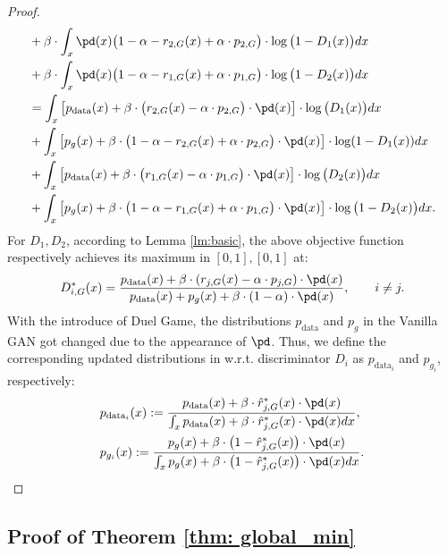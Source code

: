 \begin{proof}
{\begin{align}
\begin{split}
    &+\beta\cdot \int_{x} \pd(x)\big(1-\alpha-r_{2,G}(x)+\alpha \cdot p_{2,G}\big)\cdot \log\big(1-D_1(x)\big)dx\\
    &+\beta \cdot \int_{x} \pd(x)\big(1-\alpha-r_{1,G}(x)+\alpha \cdot p_{1,G}\big)\cdot \log\big(1-D_2(x)\big)dx\\
    &= \int_{x} \big[p_{\text{data}}(x)+\beta \cdot \big(r_{2,G}(x)-\alpha \cdot p_{2,G}\big)\cdot \pd(x)\big] \cdot\log\big(D_1(x)\big) dx\\
    &+ \int_{x} \big[p_{g}(x)+\beta \cdot \big(1-\alpha-r_{2,G}(x)+\alpha \cdot p_{2,G}\big)\cdot \pd(x)\big] \cdot\log(1-D_1(x)) dx\\
    &+ \int_{x} \big[p_{\text{data}}(x)+\beta \cdot \big(r_{1,G}(x)-\alpha \cdot p_{1,G}\big)\cdot \pd(x)\big] \cdot\log\big(D_2(x)\big) dx\\
    &+ \int_{x} \big[p_{g}(x)+\beta \cdot \big(1-\alpha-r_{1,G}(x)+\alpha \cdot p_{1,G}\big)\cdot \pd(x)\big] \cdot\log\big(1-D_2(x)\big) dx.\\
    \end{split}
\end{align}}
For $D_1, D_2$, according to Lemma \ref{lm:basic}, the above objective function respectively achieves its maximum in $[0, 1], [0, 1]$ at: 
\begin{align}
D_{i,G}^*(x)=\dfrac{p_{\text{data}}(x)+\beta \cdot (r_{j,G}(x)-\alpha \cdot p_{j, G})\cdot \pd(x)}{p_{\text{data}}(x)+p_{g}(x)+\beta \cdot (1-\alpha)\cdot \pd(x)}, \qquad i\neq j.
\end{align}
With the introduce of Duel Game, the distributions $p_{\text{data}}$ and $p_{g}$ in the Vanilla GAN got changed due to the appearance of $\pd$. Thus, we define the corresponding updated distributions in \PG{} w.r.t. discriminator $D_i$ as $p_{\text{data}_i}$ and $p_{g_i}$, respectively:
\begin{align}
\label{eqn:new_dis}
    &p_{\text{data}_i}(x) :=\dfrac{p_{\text{data}}(x)+\beta\cdot \hat{r}^*_{j,G}(x)\cdot \pd(x)}{\int_{x}p_{\text{data}}(x)+\beta\cdot \hat{r}^*_{j,G}(x)\cdot \pd(x)dx},\\
    &p_{g_i}(x) :=\dfrac{p_{g}(x)+\beta\cdot \big(1-\hat{r}^*_{j,G}(x)\big)\cdot \pd(x)}{\int_{x}p_{g}(x)+\beta\cdot \big(1-\hat{r}^*_{j,G}(x)\big)\cdot \pd(x)dx}.
\end{align}
\end{proof}

\subsection{Proof of Theorem \ref{thm: global_min}}

